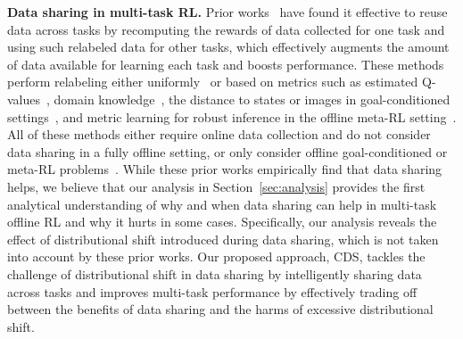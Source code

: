 \textbf{Data sharing in multi-task RL.} Prior works~\citep{andrychowicz2017hindsight,kaelbling1993learning,pong2018temporal,schaul2015universal,eysenbach2020rewriting,li2020generalized,kalashnikov2021mt,chebotar2021actionable} have found it effective to reuse data across tasks by recomputing the rewards of data collected for one task and using such relabeled data for other tasks, which effectively augments the amount of data available for learning each task and boosts performance. These methods perform relabeling either uniformly~\citep{kalashnikov2021mt} or based on metrics such as estimated Q-values~\citep{eysenbach2020rewriting,li2020generalized}, domain knowledge~\citep{kalashnikov2021mt}, the distance to states or images in goal-conditioned settings~\citep{andrychowicz2017hindsight,pong2018temporal,nair2018visual,liu2019competitive,sun2019policy,lin2019reinforcement,huang2019mapping,lynch2020grounding,yang2021bias,chebotar2021actionable}, {and metric learning for robust inference in the offline meta-RL setting~\citep{li2019multi}. All of these methods either require online data collection and do not consider data sharing in a fully offline setting, or only consider offline goal-conditioned or meta-RL problems~\citep{chebotar2021actionable,li2019multi}.} {While these prior works empirically find that data sharing helps, we believe that our analysis in Section~\ref{sec:analysis} provides the first analytical understanding of why and when data sharing can help in multi-task offline RL and why it hurts in some cases.} {Specifically, our analysis reveals the effect of distributional shift introduced during data sharing, which is not taken into account by these prior works. Our proposed approach, CDS, tackles the challenge of distributional shift in data sharing by intelligently sharing data across tasks and improves multi-task performance by effectively trading off between the benefits of data sharing and the harms of excessive distributional shift.}
